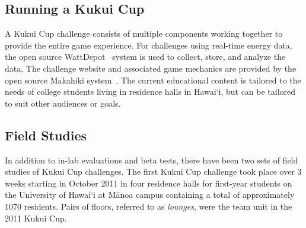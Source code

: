 \documentclass[10pt, conference, compsocconf]{IEEEtran}
\newcommand{\Hawaii}{Hawai`i\xspace}
\newcommand{\Manoa}{M\=anoa\xspace}
\begin{document}

\subsection{Running a Kukui Cup}

A Kukui Cup challenge consists of multiple components working together to provide the entire game experience. For challenges using real-time energy data, the open source WattDepot~\cite{csdl2-10-05} system is used to collect, store, and analyze the data. The challenge website and associated game mechanics are provided by the open source Makahiki system~\cite{csdl2-11-07}. The current educational content is tailored to the needs of college students living in residence halls in \Hawaii, but can be tailored to suit other audiences or goals.


\subsection{Field Studies}

In addition to in-lab evaluations and beta tests, there have been two sets of field studies of Kukui Cup challenges. The first Kukui Cup challenge took place over 3 weeks starting in October 2011 in four residence halls for first-year students on the University of \Hawaii at \Manoa campus containing a total of approximately 1070 residents. Pairs of floors, referred to as \emph{lounges}, were the team unit in the 2011 Kukui Cup.
\end{document}
